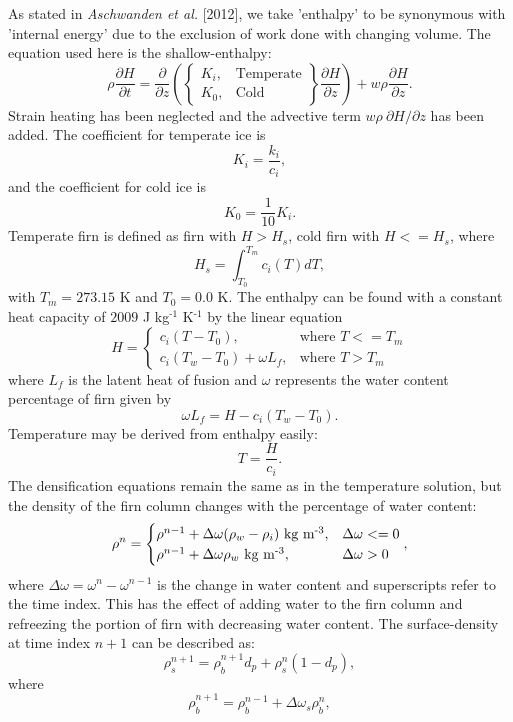 \documentclass{article}%
\newcommand{\sups}[1]{\ensuremath{^{\textrm{#1}}}}
\begin{document}
As stated in \emph{Aschwanden et al.} [2012], we take 'enthalpy' to be synonymous with 'internal energy' due to the exclusion of work done with changing volume.  The equation used here is the shallow-enthalpy:
	$$
  \rho \frac{\partial H}{\partial t} = \frac{\partial}{\partial z} 
    \left( 
      \begin{Bmatrix}
        K_i, &\text{Temperate}\\
        K_0, &\text{Cold}
      \end{Bmatrix}
      \frac{\partial H}{\partial z} 
    \right) + w \rho \frac{\partial H}{\partial z}.
  $$
Strain heating has been neglected and the advective term $w \rho\ \partial H / \partial z$ has been added.  The coefficient for temperate ice is 
  $$K_i = \frac{k_i}{c_i},$$
and the coefficient for cold ice is
  $$K_0 = \frac{1}{10}K_i.$$
Temperate firn is defined as firn with $H > H_s$, cold firn with $H <= H_s$, where
  $$H_s = \int_{T_0}^{T_m}{c_i(T)}dT,$$ 
with $T_m = 273.15$ K and $T_0 = 0.0$ K.  The enthalpy can be found with a constant heat capacity of $2009$ J kg\sups{-1} K\sups{-1} by the linear equation
  $$
  H = 
  \begin{cases}
    c_i(T - T_0), &\text{where } T <= T_m\\
    c_i(T_w - T_0) + \omega L_f,  &\text{where } T > T_m
  \end{cases}
  $$
where $L_f$ is the latent heat of fusion and $\omega$ represents the water content percentage of firn given by
  $$\omega L_f = H - c_i(T_w - T_0).$$
Temperature may be derived from enthalpy easily:
  $$T = \frac{H}{c_i}.$$
The densification equations remain the same as in the temperature solution, but the density of the firn column changes with the percentage of water content:
  $$
  \rho^n = 
  \begin{cases}
    \rho^{n-1} + \Delta\omega(\rho_w - \rho_i)\ \text{kg m\sups{-3}},  
      &\Delta\omega <= 0\\
    \rho^{n-1} + \Delta\omega\rho_w\ \text{kg m\sups{-3}}, 
      &\Delta\omega > 0
  \end{cases},
  $$
where $\Delta\omega = \omega^n - \omega^{n-1}$ is the change in water content and superscripts refer to the time index.  This has the effect of adding water to the firn column and refreezing the portion of firn with decreasing water content.  The surface-density at time index $n+1$ can be described as: 
  $$\rho_s^{n+1} = \rho_{\dot{b}}^{n+1} d_p + \rho_s^{n} (1 - d_p),$$
where
  $$\rho_{\dot{b}}^{n+1} = \rho_{\dot{b}}^{n-1} + \Delta \omega_s \rho_{\dot{b}}^n,$$
\end{document}
